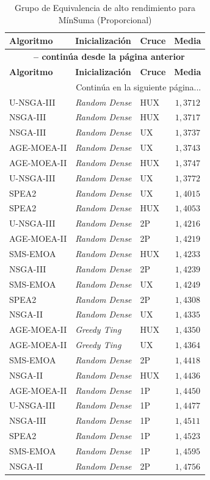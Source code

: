 \begin{longtable}{lllc}
    \caption{Grupo de Equivalencia de alto rendimiento para MínSuma (Proporcional)}
    \label{tab:elite_minsum_prop} \\
    \toprule
    \textbf{Algoritmo} & \textbf{Inicialización} & \textbf{Cruce} & \textbf{Media} \\
    \midrule
    \endfirsthead
    \multicolumn{4}{c}{{\bfseries \tablename\ \thetable{} -- continúa desde la página anterior}} \\
    \toprule
    \textbf{Algoritmo} & \textbf{Inicialización} & \textbf{Cruce} & \textbf{Media} \\
    \midrule
    \endhead
    \midrule \multicolumn{4}{r}{{Continúa en la siguiente página...}} \\
    \endfoot
    \bottomrule
    \endlastfoot
    U-NSGA-III & \textit{Random Dense} & HUX & $1{,}3712$ \\
NSGA-III & \textit{Random Dense} & HUX & $1{,}3717$ \\
NSGA-III & \textit{Random Dense} & UX & $1{,}3737$ \\
AGE-MOEA-II & \textit{Random Dense} & UX & $1{,}3743$ \\
AGE-MOEA-II & \textit{Random Dense} & HUX & $1{,}3747$ \\
U-NSGA-III & \textit{Random Dense} & UX & $1{,}3772$ \\
SPEA2 & \textit{Random Dense} & UX & $1{,}4015$ \\
SPEA2 & \textit{Random Dense} & HUX & $1{,}4053$ \\
U-NSGA-III & \textit{Random Dense} & 2P & $1{,}4216$ \\
AGE-MOEA-II & \textit{Random Dense} & 2P & $1{,}4219$ \\
SMS-EMOA & \textit{Random Dense} & HUX & $1{,}4233$ \\
NSGA-III & \textit{Random Dense} & 2P & $1{,}4239$ \\
SMS-EMOA & \textit{Random Dense} & UX & $1{,}4249$ \\
SPEA2 & \textit{Random Dense} & 2P & $1{,}4308$ \\
NSGA-II & \textit{Random Dense} & UX & $1{,}4335$ \\
AGE-MOEA-II & \textit{Greedy Ting} & HUX & $1{,}4350$ \\
AGE-MOEA-II & \textit{Greedy Ting} & UX & $1{,}4364$ \\
SMS-EMOA & \textit{Random Dense} & 2P & $1{,}4418$ \\
NSGA-II & \textit{Random Dense} & HUX & $1{,}4436$ \\
AGE-MOEA-II & \textit{Random Dense} & 1P & $1{,}4450$ \\
U-NSGA-III & \textit{Random Dense} & 1P & $1{,}4477$ \\
NSGA-III & \textit{Random Dense} & 1P & $1{,}4511$ \\
SPEA2 & \textit{Random Dense} & 1P & $1{,}4523$ \\
SMS-EMOA & \textit{Random Dense} & 1P & $1{,}4595$ \\
NSGA-II & \textit{Random Dense} & 2P & $1{,}4756$ \\
\end{longtable}

